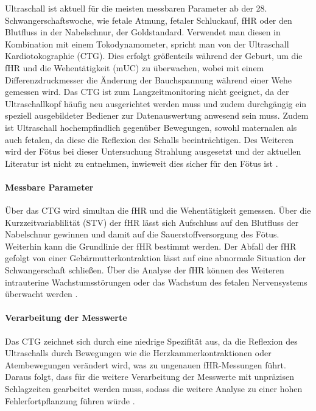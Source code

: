\documentclass[10pt,a4paper,headinclude,twoside, plainheadsepline, open=right, numbers=noenddot, twocolumn]{article}
\begin{document}
Ultraschall ist aktuell für die meisten messbaren Parameter ab der 28. Schwangerschaftswoche, wie fetale Atmung, fetaler Schluckauf, fHR oder den Blutfluss in der Nabelschnur, der Goldstandard.
Verwendet man diesen in Kombination mit einem Tokodynamometer, spricht man von der Ultraschall Kardiotokographie (CTG).
Dies erfolgt größenteils während der Geburt, um die fHR und die Wehentätigkeit (mUC) zu überwachen, wobei mit einem Differenzdruckmesser die Änderung der Bauchspannung während einer Wehe gemessen wird.
Das CTG ist zum Langzeitmonitoring nicht geeignet, da der Ultraschallkopf häufig neu ausgerichtet werden muss und zudem durchgängig ein speziell ausgebildeter Bediener zur Datenauswertung anwesend sein muss.
Zudem ist Ultraschall hochempfindlich gegenüber Bewegungen, sowohl maternalen als auch fetalen, da diese die Reflexion des Schalls beeinträchtigen.
Des Weiteren wird der Fötus bei dieser Untersuchung Strahlung ausgesetzt und der aktuellen Literatur ist nicht zu entnehmen, inwieweit dies sicher für den Fötus ist \cite{adithya2017trends}.

\paragraph{Messbare Parameter}

Über das CTG wird simultan die fHR und die Wehentätigkeit gemessen.
Über die Kurzzeitvariablilität (STV) der fHR lässt sich Aufschluss auf den Blutfluss der Nabelschnur gewinnen und damit auf die Sauerstoffversorgung des Fötus.
Weiterhin kann die Grundlinie der fHR bestimmt werden.
Der Abfall der fHR gefolgt von einer Gebärmutterkontraktion lässt auf eine abnormale Situation der Schwangerschaft schließen.
Über die Analyse der fHR können des Weiteren intrauterine Wachstumsstörungen oder das Wachstum des fetalen Nervensystems überwacht werden \cite{kovacs2011fetal}.

\paragraph{Verarbeitung der Messwerte}

Das CTG zeichnet sich durch eine niedrige Spezifität aus, da die Reflexion des Ultraschalls durch Bewegungen wie die Herzkammerkontraktionen oder Atembewegungen verändert wird, was zu ungenauen fHR-Messungen führt.
Daraus folgt, dass für die weitere Verarbeitung der Messwerte mit unpräzisen Schlagzeiten gearbeitet werden muss, sodass die weitere Analyse zu einer hohen Fehlerfortpflanzung führen würde \cite{kovacs2011fetal}.
\end{document}
